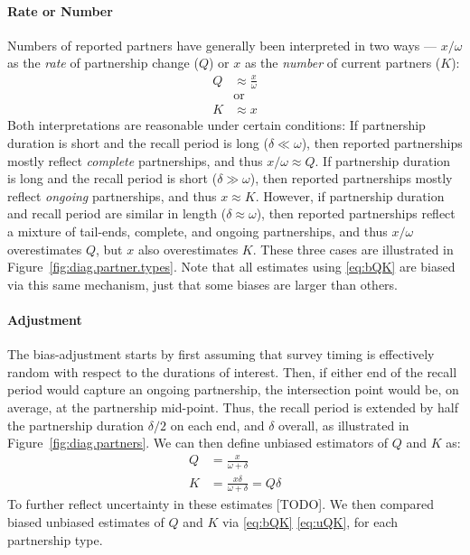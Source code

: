 \paragraph[?]{Rate or Number}
Numbers of reported partners have generally been interpreted in two ways ---
$x/\omega$ as the \emph{rate} of partnership change ($Q$) or
$x$ as the \emph{number} of current partners ($K$):
\begin{subequations}\label{eq:bQK}
\begin{alignat}{1}
  Q &\approx \frac{x}{\omega}\\
    &\text{or} \nonumber\\
  K &\approx x
\end{alignat}
\end{subequations}
Both interpretations are reasonable under certain conditions:
If partnership duration is short and the recall period is long ($\delta \ll \omega$),
then reported partnerships mostly reflect \emph{complete} partnerships,
and thus $x/\omega \approx Q$.
If partnership duration is long and the recall period is short ($\delta \gg \omega$),  %
then reported partnerships mostly reflect \emph{ongoing} partnerships,
and thus $x \approx K$.
However, if partnership duration and recall period are similar in length ($\delta \approx \omega$),
then reported partnerships reflect a mixture of tail-ends, complete, and ongoing partnerships,
and thus $x/\omega$ overestimates $Q$, but $x$ also overestimates $K$.
These three cases are illustrated in Figure~\ref{fig:diag.partner.types}.
Note that all estimates using \eqref{eq:bQK} are biased via this same mechanism,
just that some biases are larger than others.
\paragraph{Adjustment}
The bias-adjustment starts by first assuming that survey timing is
effectively random with respect to the durations of interest.
Then, if either end of the recall period would capture an ongoing partnership,
the intersection point would be, on average, at the partnership mid-point. %
Thus, the recall period is extended
by half the partnership duration $\delta/2$ on each end, and $\delta$ overall,
as illustrated in Figure~\ref{fig:diag.partners}.
We can then define unbiased estimators of $Q$ and $K$ as:
\begin{subequations}\label{eq:uQK}
\begin{alignat}{1}
  Q &= \frac{x}{\omega + \delta}\\
  K &= \frac{x \delta}{\omega + \delta} = Q \delta
\end{alignat}
\end{subequations}
To further reflect uncertainty in these estimates [TODO]. %
We then compared biased \vs unbiased estimates of $Q$ and $K$
via \eqref{eq:bQK} \vs \eqref{eq:uQK}, for each partnership type.
